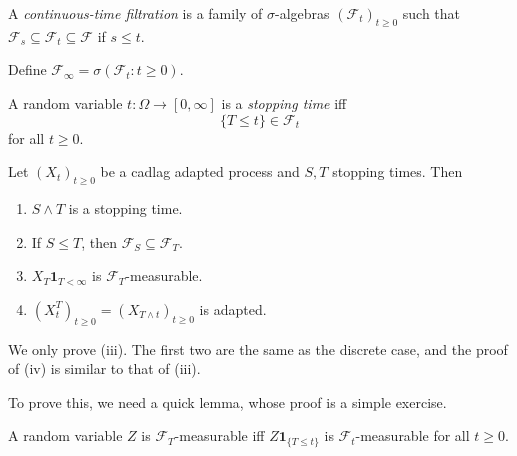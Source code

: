 \documentclass[a4paper]{article}
\begin{document}
\begin{defi}
  A \emph{continuous-time filtration} is a family of $\sigma$-algebras $(\mathcal{F}_t)_{t \geq 0}$ such that $\mathcal{F}_s \subseteq \mathcal{F}_t \subseteq \mathcal{F}$ if $s \leq t$.

  Define $\mathcal{F}_\infty = \sigma(\mathcal{F}_t: t \geq 0)$.
\end{defi}

\begin{defi}
  A random variable $t: \Omega \to [0, \infty]$ is a \emph{stopping time} iff
  \[
    \{T \leq t\} \in \mathcal{F}_t
  \]
  for all $t \geq 0$.
\end{defi}

\begin{prop}
  Let $(X_t)_{t \geq 0}$ be a cadlag adapted process and $S, T$ stopping times. Then
  \begin{enumerate}
    \item $S \wedge T$ is a stopping time.
    \item If $S \leq T$, then $\mathcal{F}_S \subseteq \mathcal{F}_T$.
    \item $X_T \mathbf{1}_{T < \infty}$ is $\mathcal{F}_T$-measurable.
    \item $(X_t^T)_{t \geq 0} = (X_{T \wedge t})_{t \geq 0}$ is adapted.
  \end{enumerate}
\end{prop}

We only prove (iii). The first two are the same as the discrete case, and the proof of (iv) is similar to that of (iii).

To prove this, we need a quick lemma, whose proof is a simple exercise.
\begin{lemma}
  A random variable $Z$ is $\mathcal{F}_T$-measurable iff $Z \mathbf{1}_{\{T \leq t\}}$ is $\mathcal{F}_t$-measurable for all $t \geq 0$.
\end{lemma}
\end{document}
